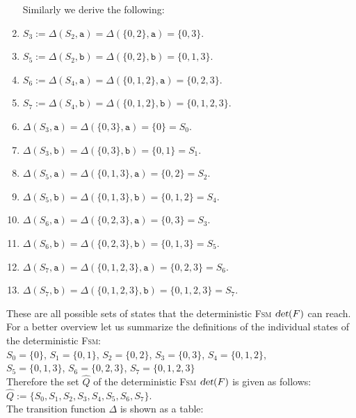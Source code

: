 \begin{enumerate}
      Similarly we derive the following:
\item $S_3 := \Delta(S_2, \texttt{a}) = \Delta(\{ 0, 2 \}, \texttt{a}) = \{0, 3 \}$.
\item $S_5 := \Delta(S_2, \texttt{b}) = \Delta(\{ 0, 2 \}, \texttt{b}) = \{0, 1, 3 \}$.
\item $S_6 := \Delta(S_4, \texttt{a}) = \Delta(\{ 0, 1, 2 \}, \texttt{a}) = \{0, 2, 3 \}$.
\item $S_7 := \Delta(S_4, \texttt{b}) = \Delta(\{ 0, 1, 2 \}, \texttt{b}) = \{0, 1, 2, 3 \}$.
\item $\Delta(S_3, \texttt{a}) = \Delta(\{ 0, 3 \}, \texttt{a}) = \{0 \} = S_0$.
\item $\Delta(S_3, \texttt{b}) = \Delta(\{ 0, 3 \}, \texttt{b}) = \{ 0, 1 \} = S_1$.
\item $\Delta(S_5, \texttt{a}) = \Delta(\{ 0, 1, 3 \}, \texttt{a}) = \{ 0, 2 \} = S_2$.
\item $\Delta(S_5, \texttt{b}) = \Delta(\{ 0, 1, 3 \}, \texttt{b}) = \{ 0, 1, 2 \} = S_4$.
\item $\Delta(S_6, \texttt{a}) = \Delta(\{ 0, 2, 3 \}, \texttt{a}) = \{ 0, 3 \} = S_3$.
\item $\Delta(S_6, \texttt{b}) = \Delta(\{ 0, 2, 3 \}, \texttt{b}) = \{ 0, 1, 3 \} = S_5$.
\item $\Delta(S_7, \texttt{a}) = \Delta(\{ 0, 1, 2, 3 \}, \texttt{a}) = \{ 0, 2, 3 \} = S_6$.
\item $\Delta(S_7, \texttt{b}) = \Delta(\{ 0, 1, 2, 3 \}, \texttt{b}) = \{ 0, 1, 2, 3 \} = S_7$.
\end{enumerate}
These are all possible sets of states that the deterministic \textsc{Fsm} $\textsl{det}(F)$ can reach.
For a better overview let us summarize the definitions of the individual states of the deterministic \textsc{Fsm}:
\\[0.2cm]
\hspace*{1.3cm} $S_0 = \{ 0 \}$, $S_1 = \{ 0, 1 \}$, $S_2 = \{ 0, 2 \}$, $S_3 = \{ 0, 3 \}$, $S_4 = \{ 0, 1, 2 \}$, 
\\[0.2cm]
\hspace*{1.3cm} $S_5 = \{ 0, 1, 3 \}$, $S_6 = \{ 0, 2, 3 \}$, $S_7 = \{ 0, 1, 2, 3 \}$
\\[0.2cm]
Therefore the set $\widehat{Q}$ of the deterministic \textsc{Fsm} $\textsl{det}(F)$ is given as follows:
\\[0.2cm]
\hspace*{1.3cm}
$\widehat{Q} := \{ S_0, S_1, S_2, S_3, S_4, S_5, S_6, S_7 \}$.
\\[0.2cm]
The transition function $\Delta$ is shown as a table:


